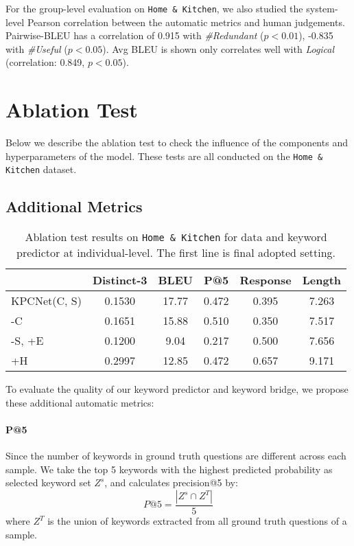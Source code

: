 \documentclass[11pt,a4paper]{article}
\begin{document}
For the group-level evaluation on \texttt{Home \& Kitchen}, we also studied the system-level Pearson correlation between the automatic metrics and human judgements. Pairwise-BLEU has a correlation  of 0.915 with \textit{\#Redundant} ($p<0.01$), -0.835 with \textit{\#Useful} ($p<0.05$). Avg BLEU is shown only correlates well with \textit{Logical} (correlation: 0.849, $p<0.05$).

\section{Ablation Test}
\label{sec:ablation}

Below we describe the ablation test to check the influence of the components and hyperparameters of the model. These tests are all conducted on the \texttt{Home \& Kitchen} dataset.

\subsection{Additional Metrics}

\begin{table*}[htbp]
  \centering
\begin{tabular}{l|ccccc}
\hline
{} & Distinct-3 & BLEU & P@5 & Response & Length \\
\hline
KPCNet(C, S) & 0.1530 & 17.77 & 0.472 & 0.395 & 7.263 \\
-C & 0.1651 & 15.88 & 0.510 & 0.350 & 7.517 \\
-S, +E & 0.1200 & 9.04 & 0.217 & 0.500 & 7.656 \\
+H & 0.2997 & 12.85 & 0.472 & 0.657 & 9.171 \\
\hline
\end{tabular}
\caption{\label{table:ablation1} Ablation test results on \texttt{Home \& Kitchen} for data and keyword predictor at individual-level. The first line is final adopted setting.}
\end{table*}

To evaluate the quality of our keyword predictor and keyword bridge, we propose these additional automatic metrics:
\paragraph{P@5} Since the number of keywords in ground truth questions are different across each sample. We take the top 5 keywords with the highest predicted probability as selected keyword set $Z^s$, and calculates precision@5 by:
\begin{equation}
  P@5 = \frac{|Z^s \cap Z^T|}{5}
\end{equation}
where $Z^T$ is the union of keywords extracted from all ground truth questions of a sample.
\end{document}
